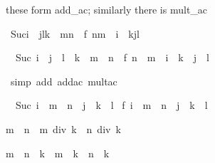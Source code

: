 \begin{isabellebody}
\begin{isamarkuptext}
these form add_ac; similarly there is mult_ac%
\end{isamarkuptext}%
\isamarkuptrue%
\ {\isachardoublequote}Suc{\isacharparenleft}i\ {\isacharplus}\ j{\isacharasterisk}l{\isacharasterisk}k\ {\isacharplus}\ m{\isacharasterisk}n{\isacharparenright}\ {\isacharequal}\ f\ {\isacharparenleft}n{\isacharasterisk}m\ {\isacharplus}\ i\ {\isacharplus}\ k{\isacharasterisk}j{\isacharasterisk}l{\isacharparenright}{\isachardoublequote}\isamarkupfalse%
%
\begin{isamarkuptxt}%
\begin{isabelle}%
\ {}{\isachardot}\ Suc\ {\isacharparenleft}i\ {\isacharplus}\ j\ {\isacharasterisk}\ l\ {\isacharasterisk}\ k\ {\isacharplus}\ m\ {\isacharasterisk}\ n{\isacharparenright}\ {\isacharequal}\ f\ {\isacharparenleft}n\ {\isacharasterisk}\ m\ {\isacharplus}\ i\ {\isacharplus}\ k\ {\isacharasterisk}\ j\ {\isacharasterisk}\ l{\isacharparenright}%
\end{isabelle}%
\end{isamarkuptxt}%
\isamarkuptrue%
\ {\isacharparenleft}simp\ add{\isacharcolon}\ add{\isacharunderscore}ac\ mult{\isacharunderscore}ac{\isacharparenright}\isamarkupfalse%
%
\begin{isamarkuptxt}%
\begin{isabelle}%
\ {}{\isachardot}\ Suc\ {\isacharparenleft}i\ {\isacharplus}\ {\isacharparenleft}m\ {\isacharasterisk}\ n\ {\isacharplus}\ j\ {\isacharasterisk}\ {\isacharparenleft}k\ {\isacharasterisk}\ l{\isacharparenright}{\isacharparenright}{\isacharparenright}\ {\isacharequal}\isanewline
{}f\ {\isacharparenleft}i\ {\isacharplus}\ {\isacharparenleft}m\ {\isacharasterisk}\ n\ {\isacharplus}\ j\ {\isacharasterisk}\ {\isacharparenleft}k\ {\isacharasterisk}\ l{\isacharparenright}{\isacharparenright}{\isacharparenright}%
\end{isabelle}%
\end{isamarkuptxt}%
\isamarkuptrue%
\isamarkupfalse%
%
\begin{isamarkuptext}%
\begin{isabelle}%
m\ {\isasymle}\ n\ {\isasymLongrightarrow}\ m\ div\ k\ {\isasymle}\ n\ div\ k%
\end{isabelle}

\begin{isabelle}%
{\isacharparenleft}m\ {\isacharminus}\ n{\isacharparenright}\ {\isacharasterisk}\ k\ {\isacharequal}\ m\ {\isacharasterisk}\ k\ {\isacharminus}\ n\ {\isacharasterisk}\ k%
\end{isabelle}


\end{isamarkuptext}
\end{isabellebody}
